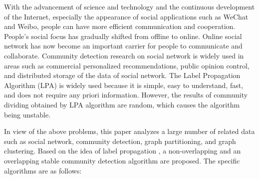 \begin{englishabstract}

With the advancement of science and technology and the continuous development of the Internet, especially the appearance of social applications such as WeChat and Weibo, people can have more efficient communication and cooperation. People's social focus has gradually shifted from offline to online. Online social network has now become an important carrier for people to communicate and collaborate. Community detection research on social network is widely used in areas such as commercial personalized recommendations, public opinion control, and distributed storage of the data of social network. The Label Propagation Algorithm (LPA) is widely used because it is simple, easy to understand, fast, and does not require any priori information. However, the results of community dividing obtained by LPA algorithm are random, which causes the algorithm being unstable.   

In view of the above problems, this paper analyzes a large number of related data such as social network, community detection, graph partitioning, and graph clustering. Based on the idea of label propagation , a non-overlapping and  an overlapping stable community detection algorithm are proposed. The specific algorithms are as follows:


\end{englishabstract}
